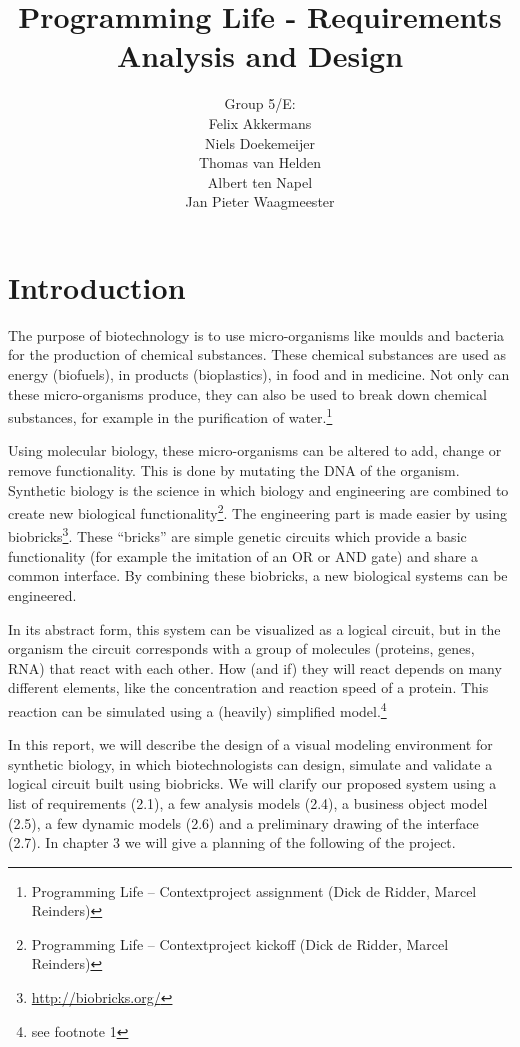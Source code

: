 \documentclass[a4paper]{article}
\title{Programming Life - Requirements Analysis and Design }
\author{Group 5/E:\\
Felix Akkermans \\
Niels Doekemeijer \\
Thomas van Helden \\
Albert ten Napel \\
Jan Pieter Waagmeester}
\begin{document}
\maketitle
\begin{center}

\end{center}

%
\vfill

\small{\tableofcontents}
\pagebreak
\section{Introduction} 		%
The purpose of biotechnology is to use micro-organisms like moulds and bacteria for the production of chemical substances. These chemical substances are used as energy (biofuels), in products (bioplastics), in food and in medicine. Not only can these micro-organisms produce, they can also be used to break down chemical substances, for example in the purification of water.\footnote{Programming Life – Contextproject assignment (Dick de Ridder, Marcel Reinders)}

Using molecular biology, these micro-organisms can be altered to add, change or remove functionality. This is done by mutating the DNA of the organism. Synthetic biology is the science in which biology and engineering are combined to create new biological functionality\footnote{Programming Life – Contextproject kickoff (Dick de Ridder, Marcel Reinders)}. The engineering part is made easier by using biobricks\footnote{\url{http://biobricks.org/}}. These “bricks” are simple genetic circuits which provide a basic functionality (for example the imitation of an OR or AND gate) and share a common interface. By combining these biobricks, a new biological systems can be engineered.

In its abstract form, this system can be visualized as a logical circuit, but in the organism the circuit corresponds with a group of molecules (proteins, genes, RNA) that react with each other. How (and if) they will react depends on many different elements, like the concentration and reaction speed of a protein. This reaction can be simulated using a (heavily) simplified model.\footnote{see footnote 1}

In this report, we will describe the design of a visual modeling environment for synthetic biology, in which biotechnologists can design, simulate and validate a logical circuit built using biobricks. We will clarify our proposed system using a list of requirements (2.1), a few analysis models (2.4), a business object model (2.5), a few dynamic models (2.6) and a preliminary drawing of the interface (2.7). In chapter 3 we will give a planning of the following of the project.
\end{document}
